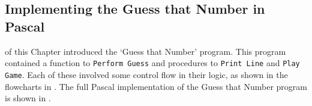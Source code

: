 \subsection{Implementing the Guess that Number in Pascal} %
\label{sub:pas_guessing_game}

 of this Chapter introduced the `Guess that Number' program. This program contained a function to \texttt{Perform Guess} and procedures to \texttt{Print Line} and \texttt{Play Game}. Each of these involved some control flow in their logic, as shown in the flowcharts in . The full Pascal implementation of the Guess that Number program is shown in .




